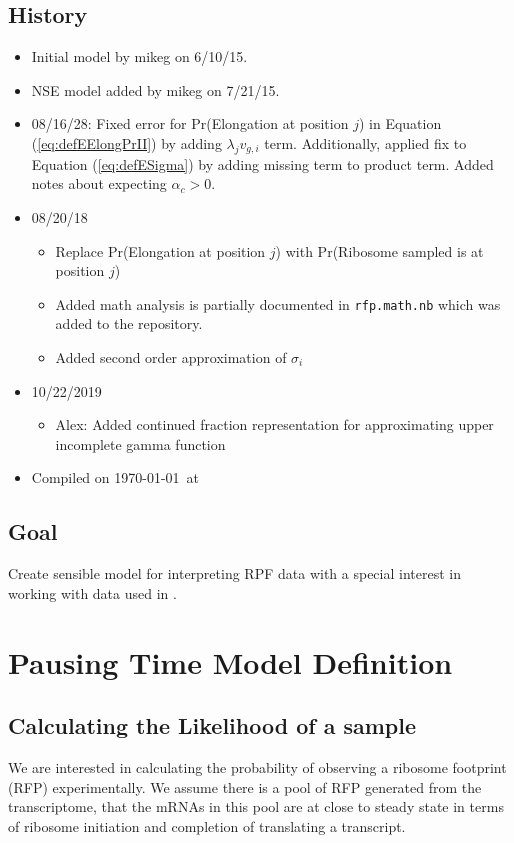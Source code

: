 \documentclass{article}
\newcommand{\alphac}{\ensuremath{{\alpha_c}}\xspace}
\begin{document}
\subsection*{History}
\begin{itemize}
\item Initial model  by mikeg on 6/10/15.
\item NSE model added by mikeg on 7/21/15.
\item 08/16/28: Fixed error for Pr(Elongation at position $j$) in Equation (\ref{eq:defEElongPrII}) by adding $\lambda_j v_{g,i}$ term.
  Additionally, applied fix to Equation (\ref{eq:defESigma}) by adding missing term to product term.
Added notes about expecting $\alphac > 0$.
\item 08/20/18
  \begin{itemize}
  \item Replace Pr(Elongation at position $j$) with Pr(Ribosome sampled is at position $j$)
  \item Added math analysis is partially documented in \texttt{rfp.math.nb} which was added to the repository.
  \item Added second order approximation of $\sigma_i$
  \end{itemize}
\item 10/22/2019
	\begin{itemize}
	\item Alex: Added continued fraction representation for approximating upper incomplete gamma function
	\end{itemize}
\item Compiled on \today \ at \ \currenttime
 \end{itemize}
\subsection*{Goal}
\label{goal}
Create sensible model for interpreting RPF data with a special interest in working with data used in \citet{PopEtAl2014}.

\section*{Pausing Time Model Definition}
\subsection*{Calculating the Likelihood of a sample}
We are interested in calculating the probability of observing a ribosome footprint (RFP) experimentally.
We assume there is a pool of RFP generated from the transcriptome, that the mRNAs in this pool are at close to steady state in terms of ribosome initiation and completion of translating a transcript.
\end{document}
